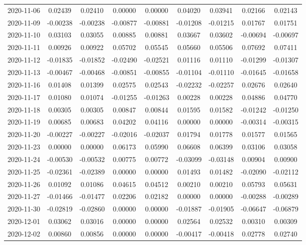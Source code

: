 {\begin{footnotesize}
\begin{longtable}{lcccccccc}
2020-11-06 & 0.02439 & 0.02410 & 0.00000 & 0.00000 & 0.04020 & 0.03941 & 0.02166 & 0.02143 \\
2020-11-09 & -0.00238 & -0.00238 & -0.00877 & -0.00881 & -0.01208 & -0.01215 & 0.01767 & 0.01751 \\
2020-11-10 & 0.03103 & 0.03055 & 0.00885 & 0.00881 & 0.03667 & 0.03602 & -0.00694 & -0.00697 \\
2020-11-11 & 0.00926 & 0.00922 & 0.05702 & 0.05545 & 0.05660 & 0.05506 & 0.07692 & 0.07411 \\
2020-11-12 & -0.01835 & -0.01852 & -0.02490 & -0.02521 & 0.01116 & 0.01110 & -0.01299 & -0.01307 \\
2020-11-13 & -0.00467 & -0.00468 & -0.00851 & -0.00855 & -0.01104 & -0.01110 & -0.01645 & -0.01658 \\
2020-11-16 & 0.01408 & 0.01399 & 0.02575 & 0.02543 & -0.02232 & -0.02257 & 0.02676 & 0.02640 \\
2020-11-17 & 0.01080 & 0.01074 & -0.01255 & -0.01263 & 0.00228 & 0.00228 & 0.04886 & 0.04770 \\
2020-11-18 & 0.00305 & 0.00305 & 0.00847 & 0.00844 & 0.01595 & 0.01582 & -0.01242 & -0.01250 \\
2020-11-19 & 0.00685 & 0.00683 & 0.04202 & 0.04116 & 0.00000 & 0.00000 & -0.00314 & -0.00315 \\
2020-11-20 & -0.00227 & -0.00227 & -0.02016 & -0.02037 & 0.01794 & 0.01778 & 0.01577 & 0.01565 \\
2020-11-23 & 0.00000 & 0.00000 & 0.06173 & 0.05990 & 0.06608 & 0.06399 & 0.03106 & 0.03058 \\
2020-11-24 & -0.00530 & -0.00532 & 0.00775 & 0.00772 & -0.03099 & -0.03148 & 0.00904 & 0.00900 \\
2020-11-25 & -0.02361 & -0.02389 & 0.00000 & 0.00000 & 0.01493 & 0.01482 & -0.02090 & -0.02112 \\
2020-11-26 & 0.01092 & 0.01086 & 0.04615 & 0.04512 & 0.00210 & 0.00210 & 0.05793 & 0.05631 \\
2020-11-27 & -0.01466 & -0.01477 & 0.02206 & 0.02182 & 0.00000 & 0.00000 & -0.00288 & -0.00289 \\
2020-11-30 & -0.02819 & -0.02860 & 0.00000 & 0.00000 & -0.01887 & -0.01905 & -0.06647 & -0.06879 \\
2020-12-01 & 0.03062 & 0.03016 & 0.00000 & 0.00000 & 0.02564 & 0.02532 & 0.00310 & 0.00309 \\
2020-12-02 & 0.00860 & 0.00856 & 0.00000 & 0.00000 & -0.00417 & -0.00418 & 0.02778 & 0.02740 \\

\end{longtable}
\end{footnotesize}}
